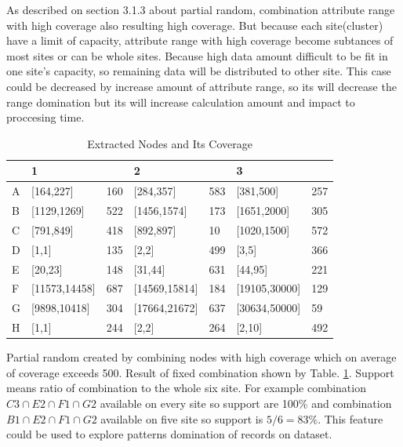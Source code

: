 \documentclass[fleqn,10pt,twocolumn]{SICE14}
\begin{document}
As described on section 3.1.3 about partial random, combination attribute range with high coverage also resulting high coverage. But because each site(cluster) have a limit of capacity, attribute range with high coverage become subtances of most sites or can be whole sites. Because high data amount difficult to be fit in one site's capacity, so remaining data will be distributed to other site. This case could be decreased by increase amount of attribute range, so its will decrease the range domination but its will increase calculation amount and impact to proccesing time. 

\begin{table}[tb]
\caption{\label{extracted-nodes-and-its-coverage}Extracted Nodes and Its Coverage}
\begin{center}
\begin{tabular}{|l|l|l|l|l|l|l|}
\hline 
 & \multicolumn{2}{l|}{1} & \multicolumn{2}{l|}{2} & \multicolumn{2}{l|}{3 }\tabularnewline
\hline 
A & {[}164,227{]} & 160 & {[}284,357{]} & 583 & {[}381,500{]} & 257\tabularnewline
\hline 
B & {[}1129,1269{]} & 522 & {[}1456,1574{]} & 173 & {[}1651,2000{]} & 305\tabularnewline
\hline 
C & {[}791,849{]} & 418 & {[}892,897{]} & 10 & {[}1020,1500{]} & 572\tabularnewline
\hline 
D & {[}1,1{]} & 135 & {[}2,2{]} & 499 & {[}3,5{]} & 366\tabularnewline
\hline 
E & {[}20,23{]} & 148 & {[}31,44{]} & 631 & {[}44,95{]} & 221\tabularnewline
\hline 
F & {[}11573,14458{]} & 687 & {[}14569,15814{]} & 184 & {[}19105,30000{]} & 129\tabularnewline
\hline 
G & {[}9898,10418{]} & 304 & {[}17664,21672{]} & 637 & {[}30634,50000{]} & 59\tabularnewline
\hline 
H & {[}1,1{]} & 244 & {[}2,2{]} & 264 & {[}2,10{]} & 492\tabularnewline
\hline 
\end{tabular}
\end{center}
\end{table}

Partial random created by combining nodes with high coverage which on average of coverage exceeds 500. Result of fixed combination shown by Table. \ref{extracted-nodes-and-its-coverage}. Support means ratio of combination to the whole six site. For example combination $C3\cap E2\cap F1\cap G2$ available on every site so support are 100\% and combination $B1\cap E2\cap F1\cap G2$ available on five site so support is $5/6 = 83\%$. This feature could be used to explore patterns domination of records on dataset.
\end{document}
